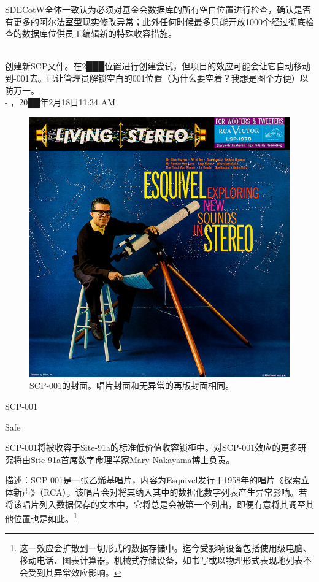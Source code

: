 SDECotW全体一致认为必须对基金会数据库的所有空白位置进行检查，确认是否有更多的阿尔法室型现实修改异常；此外任何时候最多只能开放1000个经过彻底检查的数据库位供员工编辑新的特殊收容措施。


\newpage



\begin{scpbox}
 \\
创建新SCP文件。在2███位置进行创建尝试，但项目的效应可能会让它自动移动到-001去。已让管理员解锁空白的001位置（为什么要空着？我想是图个方便）以防万一。 \\
- ，20██年2月18日11:34 AM
\end{scpbox}

\begin{figure}[H]
	\centering
	\includegraphics[width=0.5\linewidth]{images/SCP.001.a.record.2.jpg}
	\caption*{SCP-001的封面。唱片封面和无异常的再版封面相同。}
\end{figure}

SCP-001

Safe

SCP-001将被收容于Site-91a的标准低价值收容锁柜中。对SCP-001效应的更多研究将由Site-91a首席数字命理学家Mary Nakayama博士负责。

描述：SCP-001是一张乙烯基唱片，内容为Esquivel发行于1958年的唱片《探索立体新声》（RCA）。该唱片会对将其纳入其中的数据化数字列表产生异常影响。若将该唱片列入数据保存的文本中，它将总是会被第一个列出，即便有意将其调至其他位置也是如此。\footnote{这一效应会扩散到一切形式的数据存储中。迄今受影响设备包括使用级电脑、移动电话、图表计算器。机械式存储设备，如书写或以物理形式表现地列表不会受到其异常效应影响。\label{footnote 2}}

